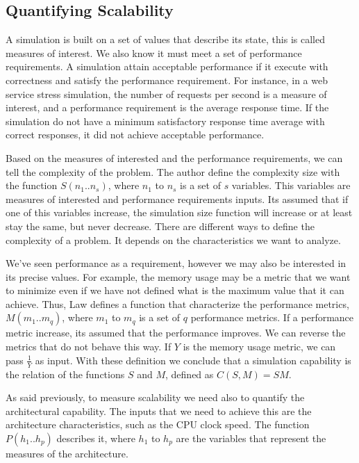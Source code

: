 \subsection{Quantifying Scalability}

A simulation is built on a set of values that describe its state, this is called measures of interest. We also know it must meet a set of performance requirements. A simulation attain acceptable performance if it execute with correctness and satisfy the performance requirement. For instance, in a web service stress simulation, the number of requests per second is a measure of interest, and a performance requirement is the average response time. If the simulation do not have a minimum satisfactory response time average with correct responses, it did not achieve acceptable performance. 

Based on the measures of interested and the performance requirements, we can tell the complexity of the problem. The author define the complexity size with the function $S(n_{1}..n_{s})$, where $n_{1}$ to $n_{s}$ is a set of $s$ variables. This variables are measures of interested and performance requirements inputs. Its assumed that if one of this variables increase, the simulation size function will increase or at least stay the same, but never decrease. There are different ways to define the complexity of a problem. It depends on the characteristics we want to analyze.

We've seen performance as a requirement, however we may also be interested in its precise values. For example, the memory usage may be a metric that we want to minimize even if we have not defined what is the maximum value that it can achieve. Thus, Law defines a function that characterize the performance metrics, $M(m_{1}..m_{q})$, where $m_{1}$ to $m_{q}$ is a set of $q$ performance metrics. If a performance metric increase, its assumed that the performance improves. We can reverse the metrics that do not behave this way. If $Y$ is the memory usage metric, we can pass $\frac{1}{Y}$ as input. With these definition we conclude that a simulation capability is the relation of the functions $S$ and $M$, defined as $C(S,M) = SM$.

As said previously, to measure scalability we need also to quantify the architectural capability. The inputs that we need to achieve this are the architecture characteristics, such as the CPU clock speed. The function $P(h_{1}..h_{p})$ describes it, where $h_{1}$ to $h_{p}$ are the variables that represent the measures of the architecture.

